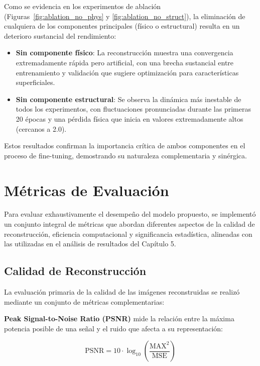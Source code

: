 Como se evidencia en los experimentos de ablación (Figuras~\ref{fig:ablation_no_phys} y \ref{fig:ablation_no_struct}), la eliminación de cualquiera de los componentes principales (físico o estructural) resulta en un deterioro sustancial del rendimiento:

\begin{itemize}
    \item \textbf{Sin componente físico}: La reconstrucción muestra una convergencia extremadamente rápida pero artificial, con una brecha sustancial entre entrenamiento y validación que sugiere optimización para características superficiales.
    \item \textbf{Sin componente estructural}: Se observa la dinámica más inestable de todos los experimentos, con fluctuaciones pronunciadas durante las primeras 20 épocas y una pérdida física que inicia en valores extremadamente altos (cercanos a 2.0).
\end{itemize}

Estos resultados confirman la importancia crítica de ambos componentes en el proceso de fine-tuning, demostrando su naturaleza complementaria y sinérgica.

\section{Métricas de Evaluación}

Para evaluar exhaustivamente el desempeño del modelo propuesto, se implementó un conjunto integral de métricas que abordan diferentes aspectos de la calidad de reconstrucción, eficiencia computacional y significancia estadística, alineadas con las utilizadas en el análisis de resultados del Capítulo 5.

\subsection{Calidad de Reconstrucción}

La evaluación primaria de la calidad de las imágenes reconstruidas se realizó mediante un conjunto de métricas complementarias:

\textbf{Peak Signal-to-Noise Ratio (PSNR)} mide la relación entre la máxima potencia posible de una señal y el ruido que afecta a su representación:

\begin{equation}
\text{PSNR} = 10 \cdot \log_{10}\left(\frac{\text{MAX}^2}{\text{MSE}}\right)
\end{equation}

